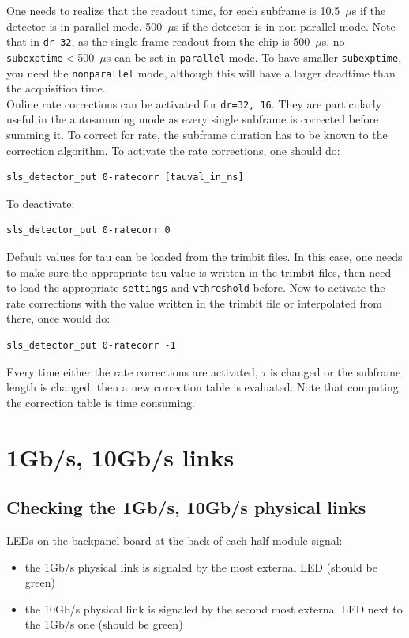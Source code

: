 \documentclass{article}
\begin{document}
One needs to realize that the readout time, for each subframe is 10.5~$\mu$s if the detector is in parallel mode. 500~$\mu$s if the detector is in non parallel mode. Note that in {\tt{dr 32}}, as the single frame readout from the chip is 500~$\mu$s, no {\tt{subexptime}}$<$500~$\mu$s can be set in {\tt{parallel}} mode. To have smaller {\tt{subexptime}}, you need the {\tt{nonparallel}} mode, although this will have a larger deadtime than the acquisition time.\\

Online rate corrections can be activated for {\tt{dr=32, 16}}. They are particularly useful in the autosumming mode as  every single subframe is corrected before summing it. To correct for rate, the subframe duration has to be known to the correction algorithm.    
To activate the rate corrections, one should do:\\
\begin{verbatim}
sls_detector_put 0-ratecorr [tauval_in_ns]
\end{verbatim}
To deactivate:
\begin{verbatim}
sls_detector_put 0-ratecorr 0
\end{verbatim}
Default values for tau can be loaded from the trimbit files. In this case, one needs to make sure the appropriate tau value is written in the trimbit files, then need to load the appropriate {\tt{settings}} and {\tt{vthreshold}} before. Now to activate the rate corrections with the value written in the trimbit file or interpolated from there, once would do: 
\begin{verbatim}
sls_detector_put 0-ratecorr -1
\end{verbatim}

Every time either the rate corrections are activated, $\tau$ is changed or the subframe length is changed, then a new correction table is evaluated. Note that computing the correction table is time consuming. 
\section{1Gb/s, 10Gb/s links}
\subsection{Checking the 1Gb/s, 10Gb/s physical links}
LEDs on the backpanel board at the back of each half module signal:
\begin{itemize}
\item  the 1Gb/s physical link is signaled by the most external LED (should be green) 
\item the 10Gb/s physical link is signaled by the second most external LED next to the 1Gb/s one (should be green) 
\end{itemize}
\end{document}
